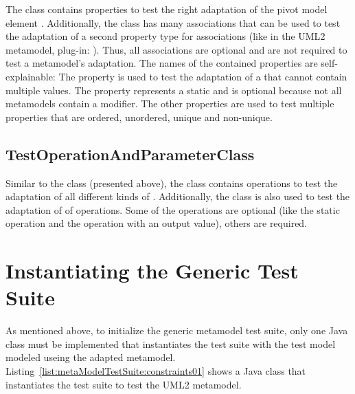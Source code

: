 The class  contains properties to test the right 
adaptation of the pivot model element . Additionally, the class 
has many associations that can be used to test the adaptation of a second
property type for associations (like in the \acs{UML}2 metamodel, plug-in: 
). Thus, all associations are 
optional and are not required to test a metamodel's adaptation. The names of 
the contained properties are self-explainable: The property 
 is used to test the adaptation of a  
that cannot contain multiple values. The property 
represents a static  and is optional because not all metamodels 
contain a  modifier. The other properties are used to test multiple
properties that are ordered, unordered, unique and non-unique.


\subsection{TestOperationAndParameterClass}

Similar to the class  (presented above), the class 
 contains operations to test the 
adaptation of all different kinds of . Additionally, the class
is also used to test the adaptation of  of operations. Some of
the operations are optional (like the static operation and the operation with 
an output value), others are required.


\section{Instantiating the Generic Test Suite}

As mentioned above, to initialize the generic metamodel test suite, only one 
Java class must be implemented that instantiates the test suite with the test 
model modeled useing the adapted metamodel. 
Listing~\ref{list:metaModelTestSuite:constraints01} shows a Java class that 
instantiates the test suite to test the \acs{UML}2 metamodel.

